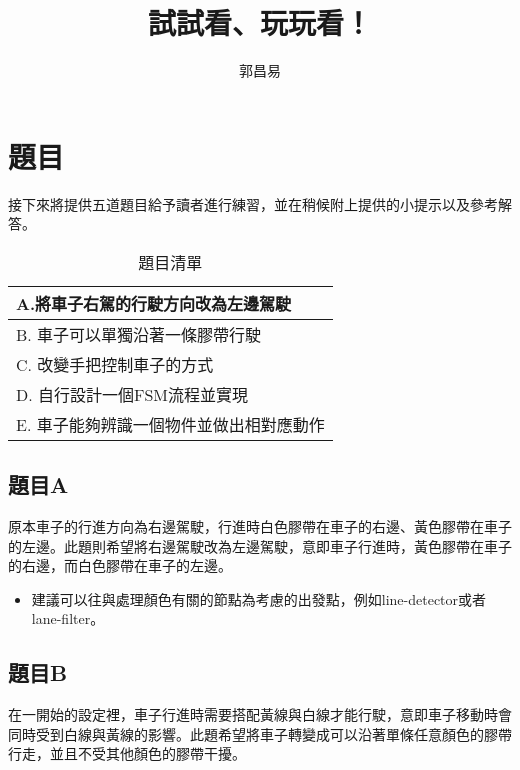 \documentclass{article}
\title{試試看、玩玩看！}
\author{郭昌易}
\date{} %
\begin{document}
\maketitle

\section{題目}

接下來將提供五道題目給予讀者進行練習，並在稍候附上提供的小提示以及參考解答。

\begin{table}[h]
\caption{題目清單}

\begin{center}
\begin{tabular}{||l||}
\hline
A.將車子右駕的行駛方向改為左邊駕駛\\
\hline
B. 車子可以單獨沿著一條膠帶行駛\\
\hline
C. 改變手把控制車子的方式\\
\hline
D. 自行設計一個FSM流程並實現\\
\hline
E. 車子能夠辨識一個物件並做出相對應動作\\
\hline
\end{tabular}
\end{center}
\end{table}

\subsection{題目A}

原本車子的行進方向為右邊駕駛，行進時白色膠帶在車子的右邊、黃色膠帶在車子的左邊。此題則希望將右邊駕駛改為左邊駕駛，意即車子行進時，黃色膠帶在車子的右邊，而白色膠帶在車子的左邊。

\begin{itemize}

\item 建議可以往與處理顏色有關的節點為考慮的出發點，例如line-detector或者lane-filter。

\end{itemize}

\subsection{題目B}

在一開始的設定裡，車子行進時需要搭配黃線與白線才能行駛，意即車子移動時會同時受到白線與黃線的影響。此題希望將車子轉變成可以沿著單條任意顏色的膠帶行走，並且不受其他顏色的膠帶干擾。
\end{document}
